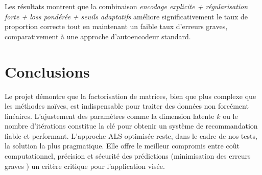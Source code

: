 \documentclass[11pt,a4paper]{article}
\begin{document}
Les résultats montrent que la combinaison \emph{encodage explicite + régularisation forte + loss pondérée + seuils adaptatifs} améliore significativement le taux de proportion correcte tout en maintenant un faible taux d’erreurs graves, comparativement à une approche d’autoencodeur standard.

\section{Conclusions}


Le projet démontre que la factorisation de matrices, bien que plus complexe que les méthodes naïves, est indispensable pour traiter des données non forcément linéaires. L'ajustement des paramètres comme la dimension latente $k$ ou le nombre d'itérations constitue la clé pour obtenir un système de recommandation fiable et performant. L'approche ALS optimisée reste, dans le cadre de nos tests, la solution la plus pragmatique. Elle offre le meilleur compromis entre coût computationnel, précision et sécurité des prédictions (minimisation des erreurs graves ) un critère critique pour l'application visée.

  
\clearpage
{} 
{} 
 
\end{document}
